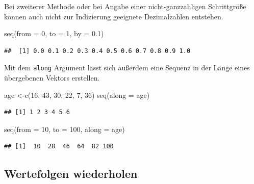 \documentclass[
]{book}
\newenvironment{Shaded}{\begin{snugshade}}{\end{snugshade}}
\newcommand{\AttributeTok}[1]{\textcolor[rgb]{0.77,0.63,0.00}{#1}}
\newcommand{\DecValTok}[1]{\textcolor[rgb]{0.00,0.00,0.81}{#1}}
\newcommand{\FloatTok}[1]{\textcolor[rgb]{0.00,0.00,0.81}{#1}}
\newcommand{\FunctionTok}[1]{\textcolor[rgb]{0.00,0.00,0.00}{#1}}
\newcommand{\NormalTok}[1]{#1}
\newcommand{\OtherTok}[1]{\textcolor[rgb]{0.56,0.35,0.01}{#1}}
\begin{document}
Bei zweiterer Methode oder bei Angabe einer nicht-ganzzahligen Schrittgröße können auch nicht zur Indizierung geeignete Dezimalzahlen entstehen.

\begin{Shaded}
\begin{Highlighting}[]
\FunctionTok{seq}\NormalTok{(}\AttributeTok{from =} \DecValTok{0}\NormalTok{, }\AttributeTok{to =} \DecValTok{1}\NormalTok{, }\AttributeTok{by =} \FloatTok{0.1}\NormalTok{)}
\end{Highlighting}
\end{Shaded}

\begin{verbatim}
##  [1] 0.0 0.1 0.2 0.3 0.4 0.5 0.6 0.7 0.8 0.9 1.0
\end{verbatim}

Mit dem \texttt{along} Argument lässt sich außerdem eine Sequenz in der Länge eines übergebenen Vektors erstellen.

\begin{Shaded}
\begin{Highlighting}[]
\NormalTok{age }\OtherTok{\textless{}{-}}\FunctionTok{c}\NormalTok{(}\DecValTok{16}\NormalTok{, }\DecValTok{43}\NormalTok{, }\DecValTok{30}\NormalTok{, }\DecValTok{22}\NormalTok{,  }\DecValTok{7}\NormalTok{, }\DecValTok{36}\NormalTok{)}
\FunctionTok{seq}\NormalTok{(}\AttributeTok{along =}\NormalTok{ age)}
\end{Highlighting}
\end{Shaded}

\begin{verbatim}
## [1] 1 2 3 4 5 6
\end{verbatim}

\begin{Shaded}
\begin{Highlighting}[]
\FunctionTok{seq}\NormalTok{(}\AttributeTok{from =} \DecValTok{10}\NormalTok{, }\AttributeTok{to =} \DecValTok{100}\NormalTok{, }\AttributeTok{along =}\NormalTok{ age)}
\end{Highlighting}
\end{Shaded}

\begin{verbatim}
## [1]  10  28  46  64  82 100
\end{verbatim}

\hypertarget{wertefolgen-wiederholen}{%
\subsection{Wertefolgen wiederholen}\label{wertefolgen-wiederholen}}
\end{document}
